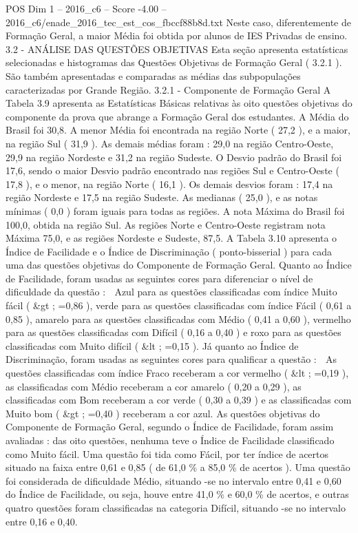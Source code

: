 \begin{textsample}{POS Dim 1 – 2016\_c6 – Score -4.00 – 2016\_c6/enade\_2016\_tec\_est\_cos\_fbccf88b8d.txt}
Neste caso, diferentemente de Formação Geral, a maior Média foi obtida por alunos de IES Privadas de ensino. 3.2 - ANÁLISE DAS QUESTÕES OBJETIVAS Esta seção apresenta estatísticas selecionadas e histogramas das Questões Objetivas de Formação Geral ( 3.2.1 ).
São também apresentadas e comparadas as médias das subpopulações caracterizadas por Grande Região. 3.2.1 - Componente de Formação Geral A Tabela 3.9 apresenta as Estatísticas Básicas relativas às oito questões objetivas do componente da prova que abrange a Formação Geral dos estudantes.
A Média do Brasil foi 30,8.
A menor Média foi encontrada na região Norte ( 27,2 ), e a maior, na região Sul ( 31,9 ).
As demais médias foram : 29,0 na região Centro-Oeste, 29,9 na região Nordeste e 31,2 na região Sudeste.
O Desvio padrão do Brasil foi 17,6, sendo o maior Desvio padrão encontrado nas regiões Sul e Centro-Oeste ( 17,8 ), e o menor, na região Norte ( 16,1 ).
Os demais desvios foram : 17,4 na região Nordeste e 17,5 na região Sudeste.
As medianas ( 25,0 ), e as notas mínimas ( 0,0 ) foram iguais para todas as regiões.
A nota Máxima do Brasil foi 100,0, obtida na região Sul.
As regiões Norte e Centro-Oeste registram nota Máxima 75,0, e as regiões Nordeste e Sudeste, 87,5.
A Tabela 3.10 apresenta o Índice de Facilidade e o Índice de Discriminação ( ponto-bisserial ) para cada uma das questões objetivas do Componente de Formação Geral.
Quanto ao Índice de Facilidade, foram usadas as seguintes cores para diferenciar o nível de dificuldade da questão :  Azul para as questões classificadas com índice Muito fácil ( \&gt ; =0,86 ), verde para as questões classificadas com índice Fácil ( 0,61 a 0,85 ), amarelo para as questões classificadas com Médio ( 0,41 a 0,60 ), vermelho para as questões classificadas com Difícil ( 0,16 a 0,40 ) e roxo para as questões classificadas com Muito difícil ( \&lt ; =0,15 ).
Já quanto ao Índice de Discriminação, foram usadas as seguintes cores para qualificar a questão :  As questões classificadas com índice Fraco receberam a cor vermelho ( \&lt ; =0,19 ), as classificadas com Médio receberam a cor amarelo ( 0,20 a 0,29 ), as classificadas com Bom receberam a cor verde ( 0,30 a 0,39 ) e as classificadas com Muito bom ( \&gt ; =0,40 ) receberam a cor azul.
As questões objetivas do Componente de Formação Geral, segundo o Índice de Facilidade, foram assim avaliadas : das oito questões, nenhuma teve o Índice de Facilidade classificado como Muito fácil.
Uma questão foi tida como Fácil, por ter índice de acertos situado na faixa entre 0,61 e 0,85 ( de 61,0 \% a 85,0 \% de acertos ).
Uma questão foi considerada de dificuldade Médio, situando -se no intervalo entre 0,41 e 0,60 do Índice de Facilidade, ou seja, houve entre 41,0 \% e 60,0 \% de acertos, e outras quatro questões foram classificadas na categoria Difícil, situando -se no intervalo entre 0,16 e 0,40.

\end{textsample}
